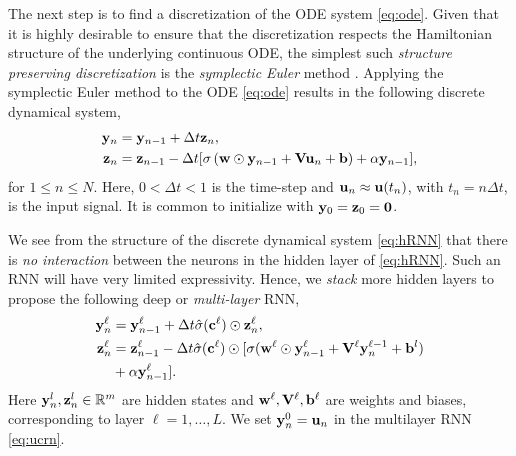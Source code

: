 \documentclass{article}
\newcommand{\by}{{\bf y}}
\newcommand{\bz}{{\bf z}}
\newcommand{\bw}{{\bf w}}
\newcommand{\bu}{{\bf u}}
\newcommand{\bb}{{\bf b}}
\newcommand{\bV}{{\bf V}}
\newcommand{\bc}{{\bf c}}
\newcommand{\R}{{\mathbb R}}
\newcommand{\Dt}{{\Delta t}}
\begin{document}
The next step is to find a discretization of the ODE system \eqref{eq:ode}. Given that it is highly desirable to ensure that the discretization respects the Hamiltonian structure of the underlying continuous ODE, the simplest such \emph{structure preserving discretization} is the \emph{symplectic Euler} method \cite{ss1,HLW1}. Applying the symplectic Euler method to the ODE \eqref{eq:ode} results in the following discrete dynamical system,
\begin{equation}
\label{eq:hRNN}
\begin{aligned} 
\by_n &= \by_{n-1} + \Dt \bz_n, \\
\bz_n &= \bz_{n-1} - \Dt[\sigma\left(\bw \odot \by_{n-1} + \bV \bu_n + \bb \right) + \alpha \by_{n-1}],
\end{aligned}
\end{equation}
for $1 \leq n \leq N$. Here, $0 < \Dt < 1$ is the time-step and $\bu_n \approx \bu(t_n)$, with $t_n = n \Dt$, is the input signal. It is common to initialize with $\by_0 = \bz_0 = \bf 0$. 

We see from the structure of the discrete dynamical system \eqref{eq:hRNN} that there is \emph{no interaction} between the neurons in the hidden layer of \eqref{eq:hRNN}. Such an RNN will have very limited expressivity. Hence, we \emph{stack} more hidden layers to propose the following deep or \emph{multi-layer} RNN,
\begin{align}
\label{eq:ucrn}
\begin{aligned} 
\by_n^{\ell} &= \by_{n-1}^{\ell} + \Dt\hat{\sigma}(\bc^{\ell})\odot \bz_n^{\ell}, \\
\bz_n^{\ell} &= \bz_{n-1}^{\ell} - \Dt\hat{\sigma}(\bc^\ell) \odot[\sigma(\bw^\ell \odot \by_{n-1}^\ell + \bV^\ell \by_n^{\ell-1} + \bb^l ) \\&+\alpha \by_{n-1}^{\ell}].
\end{aligned}
\end{align}
Here $\by_n^l,\bz_n^l \in \R^m$ are hidden states and $\bw^\ell,\bV^{\ell},\bb^{\ell}$ are weights and biases, corresponding to layer $\ell=1,\dots,L$. We set $\by_n^0 = \bu_n$ in the multilayer RNN \eqref{eq:ucrn}. 
\end{document}
